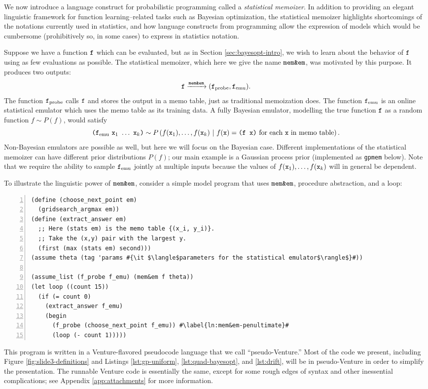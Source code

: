 We now introduce a language construct for probabilistic programming called a
\emph{statistical memoizer}.  In addition to providing an elegant linguistic
framework for function learning--related tasks such as Bayesian optimization,
the statistical memoizer highlights shortcomings of the notations currently used
in statistics, and how language constructs from programming allow the expression
of models which would be cumbersome (prohibitively so, in some cases) to express
in statistics notation.

Suppose we have a function $\texttt{f}$ which can be evaluated, but as in Section
\ref{sec:bayesopt-intro}, we wish to learn about the behavior of $\texttt{f}$ using as
few evaluations as possible.  The statistical memoizer, which here we give the
name $\texttt{mem\&em}$, was motivated by this purpose.  It produces two outputs:
\[ \texttt{f} \xrightarrow{\texttt{mem\&em}} (\texttt{f}_{\textrm{probe}}, \texttt{f}_{\textrm{emu}}). \]
The function $\texttt{f}_{\textrm{probe}}$ calls $\texttt{f}$ and stores the output in a memo
table, just as traditional memoization does.  The function $\texttt{f}_{\textrm{emu}}$ is
an online statistical emulator which uses the memo table as its training
data.  A fully Bayesian emulator, modelling the true function $\texttt{f}$ as a
random function $f \sim P(f)$, would satisfy
\[
\texttt{(}\ftt_\emu\ \xtt_1\ \ldots\ \xtt_k\texttt{)}
\sim
P\pn{
  f(\xtt_1), \ldots, f(\xtt_k)
  \mvert
  \text{$f(\xtt) = \texttt{(f x)}$ for each $\xtt$ in memo table}
}.
\]
Non-Bayesian emulators are possible as well, but here we will focus on the
Bayesian case.  Different implementations of the statistical memoizer can have
different prior distributions $P(f)$; our main example is a Gaussian process
prior (implemented as \texttt{gpmem} below).  Note that we require the ability
to sample $\texttt{f}_{\textrm{emu}}$ jointly at multiple inputs because the values of
$f(\texttt{x}_1),\ldots,f(\texttt{x}_k)$ will in general be dependent.

To illustrate the linguistic power of $\texttt{mem\&em}$, consider a simple model program
that uses $\texttt{mem\&em}$, procedure abstraction, and a loop:

\begin{lstlisting}[frame=single,escapechar=\#,numbers=left,numbersep=5pt,numberstyle=\tiny\color{gray}]
(define (choose_next_point em)
  (gridsearch_argmax em))
(define (extract_answer em)
  ;; Here (stats em) is the memo table {(x_i, y_i)}.
  ;; Take the (x,y) pair with the largest y.
  (first (max (stats em) second)))
(assume theta (tag 'params #{\it $\langle$parameters for the statistical emulator$\rangle$}#))

(assume_list (f_probe f_emu) (mem&em f theta))
(let loop ((count 15))
  (if (= count 0)
    (extract_answer f_emu)
    (begin
      (f_probe (choose_next_point f_emu)) #\label{ln:mem&em-penultimate}#
      (loop (- count 1)))))
\end{lstlisting}
This program is written in a Venture-flavored pseudocode language that we call
``pseudo-Venture.''  Most of the code we present, including Figure
\ref{fig:slide3-definitions} and Listings \ref{lst:gp-uniform},
\ref{lst:quad-bayesopt}, and \ref{lst:drift}, will be in pseudo-Venture in order
to simplify the presentation.  The runnable Venture code is essentially the
same, except for some rough edges of syntax and other inessential complications;
see Appendix \ref{app:attachments} for more information.

